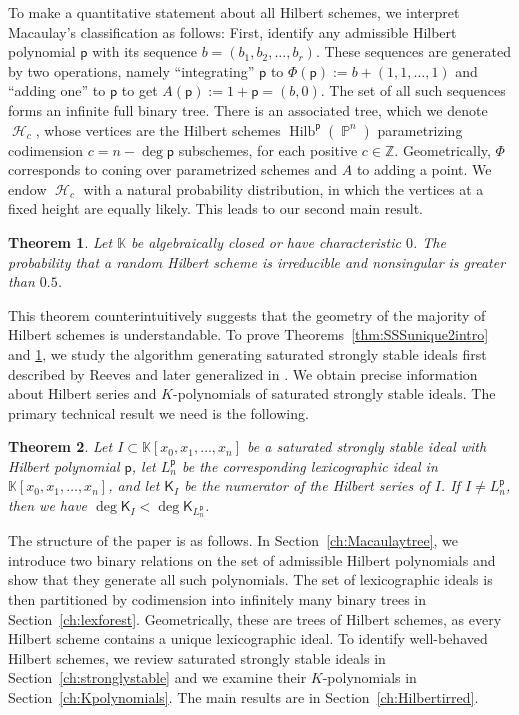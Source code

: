 \documentclass[12pt]{amsart}%
\newtheorem{theorem}{Theorem}[section]
\theoremstyle{definition}%
\DeclareMathOperator{\hilb}{Hilb}%
\DeclareMathOperator{\PP}{\mathbb{P}}%
\DeclareMathOperator{\hilbtree}{\mathscr{H}}%
\newcommand{\hp}{\mathsf{p}}%
\newcommand{\lift}{\Phi}%
\newcommand{\plus}{A}%
\newcommand{\hk}{\mathsf{K}}%
\newcommand{\kk}{\mathbb{K}}%
\newcommand{\ZZ}{\mathbb{Z}}%
\begin{document}
To make a quantitative statement about all Hilbert schemes, we
interpret Macaulay's classification as follows: First, identify any
admissible Hilbert polynomial $\hp$ with its sequence $b = (b_1, b_2,
\ldots, b_r)$.  These sequences are generated by two operations,
namely ``integrating'' $\hp$ to $\lift (\hp) := b + (1,1, \ldots, 1)$
and ``adding one'' to $\hp$ to get $\plus (\hp) := 1 + \hp = (b, 0)$.
The set of all such sequences forms an infinite full binary tree.
There is an associated tree, which we denote $\hilbtree_c$, whose
vertices are the Hilbert schemes $\hilb^{\hp}(\PP^n)$ parametrizing
codimension $c = n - \deg \hp$ subschemes, for each positive $c \in
\ZZ$.  Geometrically, $\lift$ corresponds to coning over parametrized
schemes and $\plus$ to adding a point.  We endow $\hilbtree_c$ with a
natural probability distribution, in which the vertices at a fixed
height are equally likely.  This leads to our second main result.

\begin{theorem}
  \label{thm:Hilbertprobintro}
  Let $\kk$ be algebraically closed or have characteristic $0$.  The
  probability that a random Hilbert scheme is irreducible and
  nonsingular is greater than $0.5$.
\end{theorem}

This theorem counterintuitively suggests that the geometry of the
majority of Hilbert schemes is understandable.  To prove
Theorems~\ref{thm:SSSunique2intro} and \ref{thm:Hilbertprobintro}, we
study the algorithm generating saturated strongly stable ideals first
described by Reeves \cite{Reeves--1992} and later generalized in
\cite{Moore--2012, Cioffi--Lella--Marinari--Roggero--2011}.  We obtain
precise information about Hilbert series and $K$-polynomials of
saturated strongly stable ideals.  The primary technical result we
need is the following.

\begin{theorem}
  \label{thm:Kpolydegreeintro}
  Let $I \subset \kk[x_0, x_1, \dotsc , x_n]$ be a saturated strongly
  stable ideal with Hilbert polynomial $\hp$, let $L^{\hp}_n$ be the
  corresponding lexicographic ideal in $\kk[x_0, x_1, \dotsc, x_n]$,
  and let $\hk_I$ be the numerator of the Hilbert series of $I$.  If
  $I \ne L^{\hp}_n$, then we have $\deg \hk_{I} < \deg
  \hk_{L^{\hp}_n}$.
\end{theorem}

The structure of the paper is as follows.  In
Section~\ref{ch:Macaulaytree}, we introduce two binary relations on
the set of admissible Hilbert polynomials and show that they generate
all such polynomials.  The set of lexicographic ideals is then
partitioned by codimension into infinitely many binary trees in
Section~\ref{ch:lexforest}.  Geometrically, these are trees of Hilbert
schemes, as every Hilbert scheme contains a unique lexicographic
ideal.  To identify well-behaved Hilbert schemes, we review saturated
strongly stable ideals in Section~\ref{ch:stronglystable} and we
examine their $K$-polynomials in Section~\ref{ch:Kpolynomials}.  The
main results are in Section~\ref{ch:Hilbertirred}.
\end{document}
